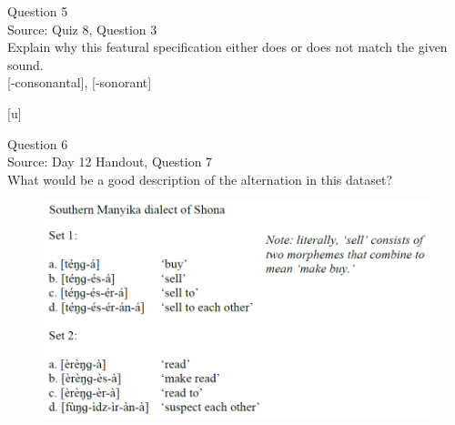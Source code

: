 \documentclass[12pt]{article}
\begin{document}
\newpage

{\large Question 5}\\

Source: Quiz 8, Question 3\\

Explain why this featural specification either does or does not match the given sound.\\

{[-consonantal]}, {[-sonorant]}

{[u]}


\newpage

{\large Question 6}\\

Source: Day 12 Handout, Question 7\\

What would be a good description of the alternation in this dataset?\\

\begin{figure}[H]
\includegraphics{../images/shona.png}
\end{figure}

\newpage

\begin{center}
\textbf{{\color{red}{\HUGE END OF EXAM}}}\\

\end{center}
\newpage

\begin{center}
\textbf{{\color{blue}{\HUGE START OF EXAM\\}}}

\textbf{{\color{blue}{\HUGE Student ID: 6948\\}}}

\textbf{{\color{blue}{\HUGE 2:20 - 2:40 PM\\}}}

\end{center}
\newpage
\end{document}
